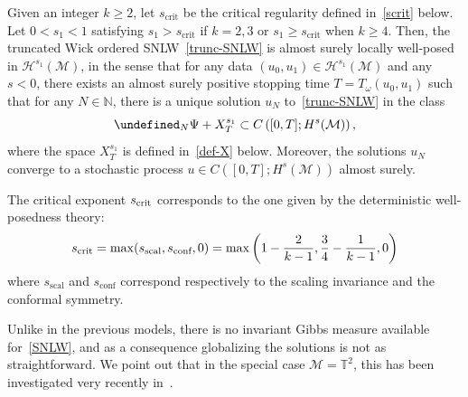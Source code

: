 \documentclass[AHL,Unicode,longabstracts,published]{cedram}
\newcommand{\scrit}{s_{\textup{crit}}}
\newcommand{\sscal}{s_{\text{scal}}}
\newcommand{\sconf}{s_{\text{conf}}}
\newcommand{\T}{\mathbb{T}}
\newcommand{\N}{\mathbb{N}}
\let\P= \undefined
\newcommand{\P}{\mathbf{P}}
\newcommand{\M}{\mathcal{M}}
\renewcommand{\H}{\mathcal{H}}
\newcommand{\crit}{\mathrm{crit}}
\renewcommand{\o}{\omega}
\begin{document}
\begin{theo}\label{thm-SNLW}
Given an integer $k \geq 2$, let $s_\crit$ be the critical regularity defined in~\eqref{scrit} below. Let $0<s_1<1$ satisfying $s_1>s_\crit$ if $k=2,3$ or $s_1\geq s_\crit$ when $k\geq 4$. Then, the truncated Wick ordered SNLW~\eqref{trunc-SNLW} is almost surely locally well-posed in $\H^{s_1}(\M)$, in the sense that for any data $(u_0,u_1)\in\H^{s_1}(\M)$ and any $s<0$, there exists an almost surely positive stopping time $T=T_\o(u_0,u_1)$ such that for any $N\in\N$, there is a unique solution $u_N$ to~\eqref{trunc-SNLW} in the class
\begin{equation*}
\P_N\Psi + X^{s_1}_T\subset C\left([0, T];H^{s}(\M)\right),
\end{equation*}
where the space $X^{s_1}_T$ is defined in~\eqref{def-X} below. Moreover, the solutions $u_N$ converge to a stochastic process $u\in C([0,T];H^s(\M))$ almost surely.
\end{theo}


The critical exponent $\scrit$ corresponds to the one given by the deterministic well-posedness theory:
\begin{equation}\label{scrit}
\scrit=\max(\sscal,\sconf,0)=\max\left(1-\frac2{k-1},\frac34-\frac1{k-1},0\right)
\end{equation}
where $\sscal$ and $\sconf$ correspond respectively to the scaling invariance and the conformal symmetry.

Unlike in the previous models, there is no invariant Gibbs measure available for~\eqref{SNLW}, and as a consequence globalizing the solutions is not as straightforward. We point out that in the special case $\M=\T^2$, this has been investigated very recently in~\cite{GKOT}.
\end{document}
